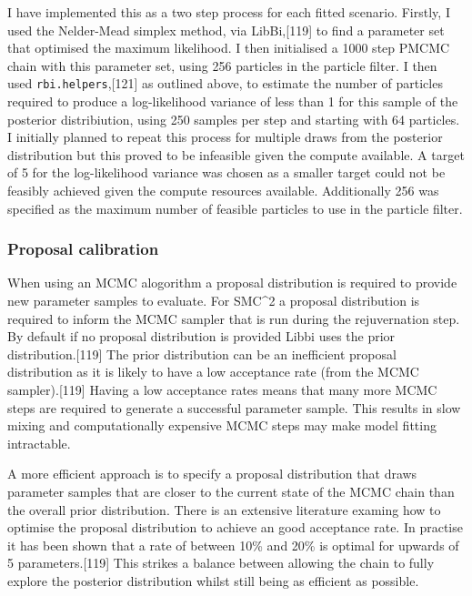 \documentclass[11pt,twoside]{bristolthesis}
\begin{document}
  I have implemented this as a two step process for each fitted scenario. Firstly, I used the Nelder-Mead simplex method, via LibBi,{[}119{]} to find a parameter set that optimised the maximum likelihood. I then initialised a 1000 step PMCMC chain with this parameter set, using 256 particles in the particle filter. I then used \texttt{rbi.helpers},{[}121{]} as outlined above, to estimate the number of particles required to produce a log-likelihood variance of less than 1 for this sample of the posterior distribiution, using 250 samples per step and starting with 64 particles. I initially planned to repeat this process for multiple draws from the posterior distribution but this proved to be infeasible given the compute available. A target of 5 for the log-likelihood variance was chosen as a smaller target could not be feasibly achieved given the compute resources available. Additionally 256 was specified as the maximum number of feasible particles to use in the particle filter.
  
  \hypertarget{proposal-calibration}{%
  \subsubsection{Proposal calibration}\label{proposal-calibration}}
  
  When using an MCMC alogorithm a proposal distribution is required to provide new parameter samples to evaluate. For SMC\^{}2 a proposal distribution is required to inform the MCMC sampler that is run during the rejuvernation step. By default if no proposal distribution is provided Libbi uses the prior distribution.{[}119{]} The prior distribution can be an inefficient proposal distribution as it is likely to have a low acceptance rate (from the MCMC sampler).{[}119{]} Having a low acceptance rates means that many more MCMC steps are required to generate a successful parameter sample. This results in slow mixing and computationally expensive MCMC steps may make model fitting intractable.
  
  A more efficient approach is to specify a proposal distribution that draws parameter samples that are closer to the current state of the MCMC chain than the overall prior distribution. There is an extensive literature examing how to optimise the proposal distribution to achieve an good acceptance rate. In practise it has been shown that a rate of between 10\% and 20\% is optimal for upwards of 5 parameters.{[}119{]} This strikes a balance between allowing the chain to fully explore the posterior distribution whilst still being as efficient as possible.
  
\end{document}
